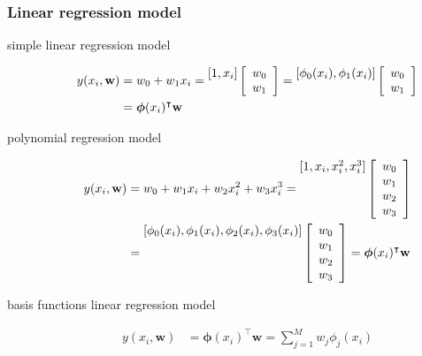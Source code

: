 \begin{frame}
    \frametitle{Linear regression model}

	\scriptsize
	\begin{description}
		\item[simple linear regression model]
			\begin{align*}
                y(x_i, \mathbf{w})&=w_0+w_1x_i
				                   =\raisebox{0.60em}{$[1,x_i]$}
									\left[\begin{array}{c}
								        w_0\\
								        w_1
								    \end{array}\right]
				                   =\raisebox{0.60em}{$[\phi_0(x_i),\phi_1(x_i)]$}
									\left[\begin{array}{c}
								        w_0\\
								        w_1
								    \end{array}\right]\\
                                  & =
									\boldsymbol{\phi}(x_i)^\intercal\mathbf{w}
			\end{align*}
		\item[polynomial regression model]
			\begin{align*}
				y(x_i, \mathbf{w})&=w_0+w_1x_i+w_2x_i^2+w_3x_i^3
				                   =\raisebox{1.80em}{$[1,x_i,x_i^2,x_i^3]$}
									\left[\begin{array}{c}
								        w_0\\
								        w_1\\
								        w_2\\
								        w_3
								    \end{array}\right]\\
				                  &=\raisebox{1.80em}{$[\phi_0(x_i),\phi_1(x_i),\phi_2(x_i),\phi_3(x_i)]$}
									\left[\begin{array}{c}
								        w_0\\
								        w_1\\
								        w_2\\
								        w_3
								    \end{array}\right]=
									\boldsymbol{\phi}(x_i)^\intercal\mathbf{w}
			\end{align*}
		\item[basis functions linear regression model]
			\begin{align*}
				y(x_i, \mathbf{w})&=\boldsymbol{\phi}(x_i)^\intercal\mathbf{w}=\sum_{j=1}^Mw_j\phi_j(x_i)
			\end{align*}
	\end{description}
	\normalsize
\end{frame}

